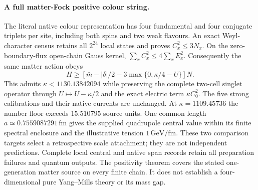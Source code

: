 \paragraph{A full matter-Fock positive colour string.}
The literal native colour representation has four fundamental and four
conjugate triplets per site, including both spins and two weak flavours.
An exact Weyl-character census retains all $2^{24}$ local states and proves
$C_x^2\leq3N_x$. On the zero-boundary-flux open-chain Gauss kernel,
$\sum_x C_x^2\leq4\sum_x E_x^2$. Consequently the same matter action obeys
\[
 H\geq\left[\bar m-|\delta|/2
       -3\max\{0,\kappa/4-U\}\right]N.
\]
This admits $\kappa<1130.13842094$ while preserving the complete two-cell
singlet operator through $U\mapsto U-\kappa/2$ and the exact electric
term $\kappa C_0^2$. The five strong calibrations and their native currents
are unchanged. At $\kappa=1109.45736$ the number floor exceeds $15.510795$
source units. One common length $a\simeq0.7559087291\,\mathrm{fm}$ gives
the supplied quadrupole central value within its finite spectral enclosure
and the illustrative tension $1\,\mathrm{GeV/fm}$.
These two comparison targets select a retrospective scale attachment;
they are not independent predictions. Complete local central and native
span records retain all preparation failures and quantum outputs.
The positivity theorem covers the stated one-generation matter source on
every finite chain. It does not establish a four-dimensional pure
Yang--Mills theory or its mass gap.
